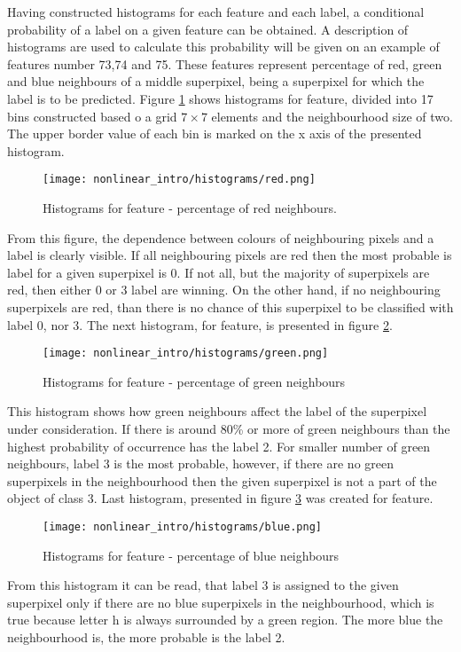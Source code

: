Having constructed histograms for each feature and each label, a conditional probability of a label on a given feature can be obtained. A description of histograms are used to calculate this probability will be given on an example of features number 73,74 and 75. These features represent percentage of red, green and blue neighbours of a middle superpixel, being a superpixel for which the label is to be predicted. Figure \ref{fig:nonlinear_histogram_red} shows histograms for  feature, divided into 17 bins constructed based o a grid $7 \times 7$ elements and the neighbourhood size of two. The upper border value of each bin is marked on the x axis of the presented histogram. 
\begin{figure}[ht]
    \centering
    \texttt{[image: nonlinear\_intro/histograms/red.png]}
    \caption{Histograms for  feature - percentage of red neighbours.}
    \label{fig:nonlinear_histogram_red}
\end{figure}
From this figure, the dependence between colours of neighbouring pixels and a label is clearly visible. If all neighbouring pixels are red then the most probable is label for a given superpixel is 0. If not all, but the majority of superpixels are red, then either 0 or 3 label are winning. On the other hand, if no neighbouring superpixels are red, than there is no chance of this superpixel to be classified with label 0, nor 3. The next histogram, for  feature, is presented in figure \ref{fig:nonlinear_histogram_green}.
\begin{figure}[ht]
    \centering
    \texttt{[image: nonlinear\_intro/histograms/green.png]}
    \caption{Histograms for  feature - percentage of green neighbours}
    \label{fig:nonlinear_histogram_green}
\end{figure}
This histogram shows how green neighbours affect the label of the superpixel under consideration. If there is around 80\% or more of green neighbours than the highest probability of occurrence has the label 2. For smaller number of green neighbours, label 3 is the most probable, however, if there are no green superpixels in the neighbourhood then the given superpixel is not a part of the object of class 3. Last histogram, presented in figure \ref{fig:nonlinear_histogram_blue} was created for  feature.
\begin{figure}[ht]
    \centering
    \texttt{[image: nonlinear\_intro/histograms/blue.png]}
    \caption{Histograms for  feature - percentage of blue neighbours}
    \label{fig:nonlinear_histogram_blue}
\end{figure}
From this histogram it can be read, that label 3 is assigned to the given superpixel only if there are no blue superpixels in the neighbourhood, which is true because letter h is always surrounded by a green region. The more blue the neighbourhood is, the more probable is the label 2.

